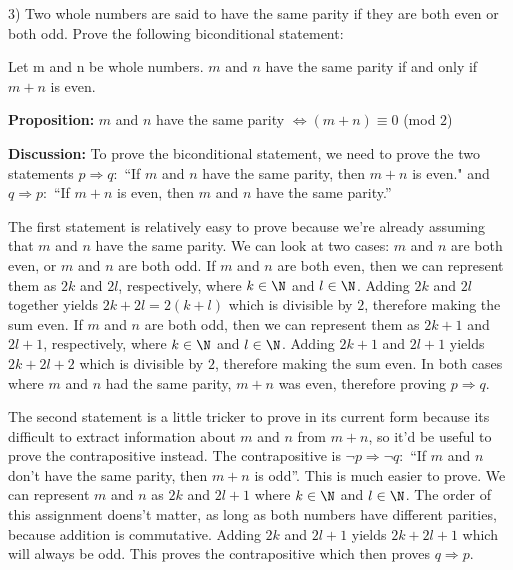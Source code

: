 	\begin{paragraph}{3)}
		Two whole numbers are said to have the same parity if they are both even or both odd. Prove the following biconditional statement:
		\begin{center}
			Let m and n be whole numbers. $m$ and $n$ have the same parity if and only if $m + n$ is even.
		\end{center}

		\separate\spacing

		\textbf{Proposition:} $m$ and $n$ have the same parity $\iff (m + n) \equiv 0$ (mod $2$)\spacing

		\textbf{Discussion:} To prove the biconditional statement, we need to prove the two 
		statements $p \Rightarrow q:$ ``If $m$ and $n$ have the same parity, then $m + n$ is even."
		and $q \Rightarrow p:$ ``If $m + n$ is even, then $m$ and $n$ have the same parity.'' \spacing

		\leftIndent The first statement is relatively easy to prove because
		we're already assuming that $m$ and $n$ have the same parity. We can look 
		at two cases: $m$ and $n$ are both even, or $m$ and $n$ are both odd.
		If $m$ and $n$ are both even, then we can represent them as 
		$2k$ and $2l$, respectively, where $k \in \N$ and $l \in \N$. 
		Adding $2k$ and $2l$ together yields $2k + 2l = 2(k + l)$ which is divisible by $2$, 
		therefore making the sum even. If $m$ and $n$ are both odd, then we can represent them as
		$2k + 1$ and $2l + 1$, respectively, where $k \in \N$ and
		$l \in \N$. Adding $2k + 1$ and $2l + 1$ yields 
		$2k + 2l + 2$ which is divisible by $2$, therefore making the sum even.
		In both cases where $m$ and $n$ had the same parity, $m + n$
		was even, therefore proving $p \Rightarrow q$. \spacing

		\leftIndent The second statement is a little tricker to prove in its current form
		because its difficult to extract information about $m$ and $n$ from
		$m + n$, so it'd be useful to prove the contrapositive instead.
		The contrapositive is $\neg p \Rightarrow \neg q:$ ``If $m$ and $n$
		don't have the same parity, then $m + n$ is odd''. This is much easier 
		to prove. We can represent $m$ and $n$ as $2k$ and $2l + 1$ where
		$k \in \N$ and $l \in \N$. The order of this assignment doens't matter,
		as long as both numbers have different parities, because addition is
		commutative. Adding $2k$ and $2l + 1$ yields $2k + 2l + 1$ which will always be odd.
		This proves the contrapositive which then proves $q \Rightarrow p$. \spacing


\end{paragraph}

